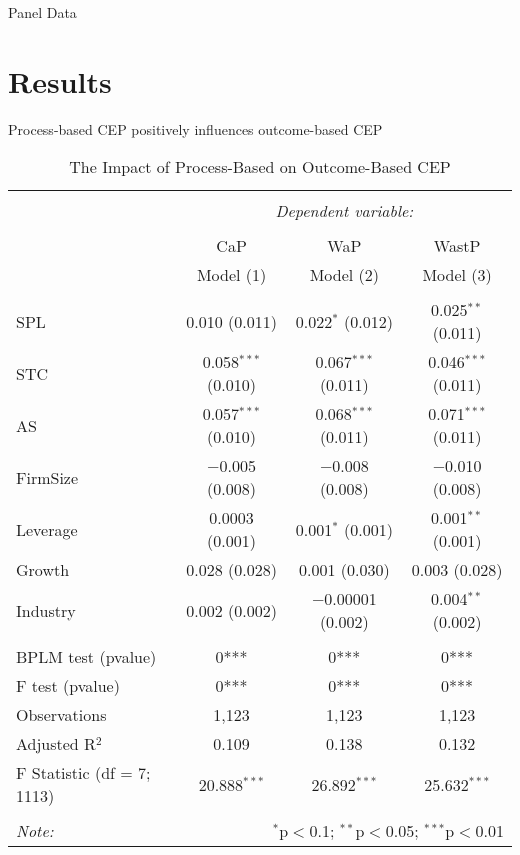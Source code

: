 \documentclass[ignorenonframetext,]{beamer}
\begin{document}
\begin{frame}{Panel Data}

\end{frame}

\begin{frame}

\end{frame}

\section{Results}\label{results}

\begin{frame}{Process-based CEP positively influences outcome-based CEP}

\begin{table}[!] \centering 
  \caption{The Impact of Process-Based on Outcome-Based CEP} 
  \label{CepResults} 
\tiny 
\begin{tabular}{@{\extracolsep{5pt}}lccc} 
\\[-1.8ex]\hline 
\hline \\[-1.8ex] 
 & \multicolumn{3}{c}{\textit{Dependent variable:}} \\ 
\cline{2-4} 
\\[-1.8ex] & CaP & WaP & WastP \\ 
 & Model (1) & Model (2) & Model (3) \\ 
\hline \\[-1.8ex] 
 SPL & 0.010 (0.011) & 0.022$^{*}$ (0.012) & 0.025$^{**}$ (0.011) \\ 
  STC & 0.058$^{***}$ (0.010) & 0.067$^{***}$ (0.011) & 0.046$^{***}$ (0.011) \\ 
  AS & 0.057$^{***}$ (0.010) & 0.068$^{***}$ (0.011) & 0.071$^{***}$ (0.011) \\ 
  FirmSize & $-$0.005 (0.008) & $-$0.008 (0.008) & $-$0.010 (0.008) \\ 
  Leverage & 0.0003 (0.001) & 0.001$^{*}$ (0.001) & 0.001$^{**}$ (0.001) \\ 
  Growth & 0.028 (0.028) & 0.001 (0.030) & 0.003 (0.028) \\ 
  Industry & 0.002 (0.002) & $-$0.00001 (0.002) & 0.004$^{**}$ (0.002) \\ 
 \hline \\[-1.8ex] 
BPLM test (pvalue) & 0*** & 0*** & 0*** \\ 
F test (pvalue) & 0*** & 0*** & 0*** \\ 
Observations & 1,123 & 1,123 & 1,123 \\ 
Adjusted R$^{2}$ & 0.109 & 0.138 & 0.132 \\ 
F Statistic (df = 7; 1113) & 20.888$^{***}$ & 26.892$^{***}$ & 25.632$^{***}$ \\ 
\hline 
\hline \\[-1.8ex] 
\textit{Note:}  & \multicolumn{3}{r}{$^{*}$p$<$0.1; $^{**}$p$<$0.05; $^{***}$p$<$0.01} \\ 
\end{tabular} 
\end{table}

\end{frame}
\end{document}
